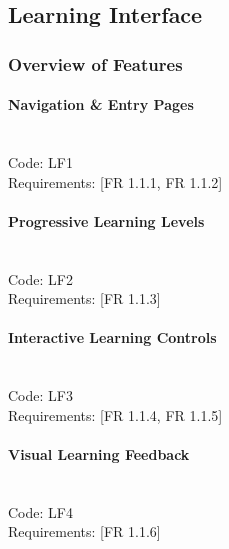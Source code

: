 \documentclass{article}
\begin{document}
\subsection{Learning Interface}
\subsubsection{Overview of Features}

\paragraph{Navigation \& Entry Pages} \mbox{} \\
\noindent Code: LF1 \\
\noindent Requirements: [FR 1.1.1, FR 1.1.2]

\paragraph{Progressive Learning Levels} \mbox{} \\
\noindent Code: LF2 \\
\noindent Requirements: [FR 1.1.3]

\paragraph{Interactive Learning Controls} \mbox{} \\
\noindent Code: LF3 \\
\noindent Requirements: [FR 1.1.4, FR 1.1.5]

\paragraph{Visual Learning Feedback} \mbox{} \\
\noindent Code: LF4 \\
\noindent Requirements: [FR 1.1.6]
\end{document}

